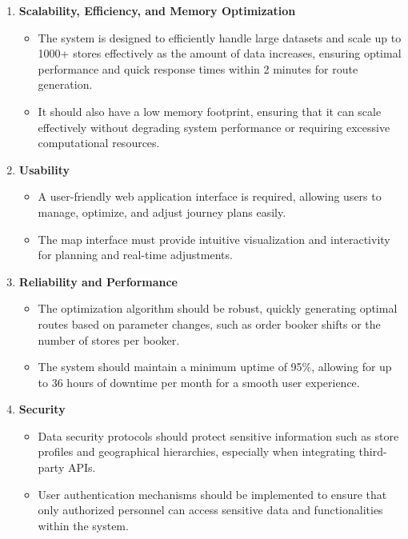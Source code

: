 \begin{enumerate}
    \item \textbf{Scalability, Efficiency, and Memory Optimization}
    \begin{itemize}
        \item The system is designed to efficiently handle large datasets and scale up to 1000+ stores effectively as the amount of data increases, ensuring optimal performance and quick response times within 2 minutes for route generation.
        \item It should also have a low memory footprint, ensuring that it can scale effectively without degrading system performance or requiring excessive computational resources.
    \end{itemize}
    
    \item \textbf{Usability}
    \begin{itemize}
        \item A user-friendly web application interface is required, allowing users to manage, optimize, and adjust journey plans easily.
        \item The map interface must provide intuitive visualization and interactivity for planning and real-time adjustments.
    \end{itemize}
    
    \item \textbf{Reliability and Performance}
    \begin{itemize}
        \item The optimization algorithm should be robust, quickly generating optimal routes based on parameter changes, such as order booker shifts or the number of stores per booker.
        \item The system should maintain a minimum uptime of 95\%, allowing for up to 36 hours of downtime per month for a smooth user experience.
        
    \end{itemize}
    
    \item \textbf{Security}
    \begin{itemize}
        \item Data security protocols should protect sensitive information such as store profiles and geographical hierarchies, especially when integrating third-party APIs.
        \item User authentication mechanisms should be implemented to ensure that only authorized personnel can access sensitive data and functionalities within the system.


\end{itemize}
\end{enumerate}
